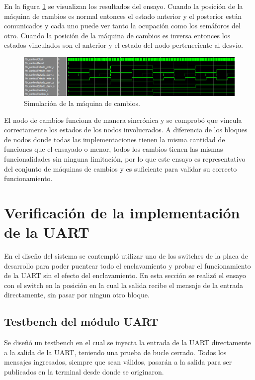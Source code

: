 		En la figura \ref{fig:Test_Cambios} se visualizan los resultados del ensayo. Cuando la posición de la máquina de cambios es normal entonces el estado anterior y el posterior están comunicados y cada uno puede ver tanto la ocupación como los semáforos del otro. Cuando la posición de la máquina de cambios es inversa entonces los estados vinculados son el anterior y el estado del nodo perteneciente al desvío.
		
		\begin{figure}[h]
		\centering
		\includegraphics[scale=0.55]{./Figures/Test/Cambio}
			\caption{Simulación de la máquina de cambios.}
			\label{fig:Test_Cambios}
		\end{figure}
			
			
		El nodo de cambios funciona de manera sincrónica y se comprobó que vincula correctamente los estados de los nodos involucrados. A diferencia de los bloques de nodos donde todas las implementaciones tienen la misma cantidad de funciones que el ensayado o menor, todos los cambios tienen las mismas funcionalidades sin ninguna limitación, por lo que este ensayo es representativo del conjunto de máquinas de cambios y es suficiente para validar su correcto funcionamiento.
				
\section{Verificación de la implementación de la UART}

	En el diseño del sistema se contempló utilizar uno de los switches de la placa de desarrollo para poder puentear todo el enclavamiento y probar el funcionamiento de la UART sin el efecto del enclavamiento. En esta sección se realizó el ensayo con el switch en la posición en la cual la salida recibe el mensaje de la entrada directamente, sin pasar por ningun otro bloque.

	\subsection{Testbench del módulo UART}
			
		Se diseñó un testbench en el cual se inyecta la entrada de la UART directamente a la salida de la UART, teniendo una prueba de bucle cerrado. Todos los mensajes ingresados, siempre que sean válidos, pasarán a la salida para ser publicados en la terminal desde donde se originaron.
						
